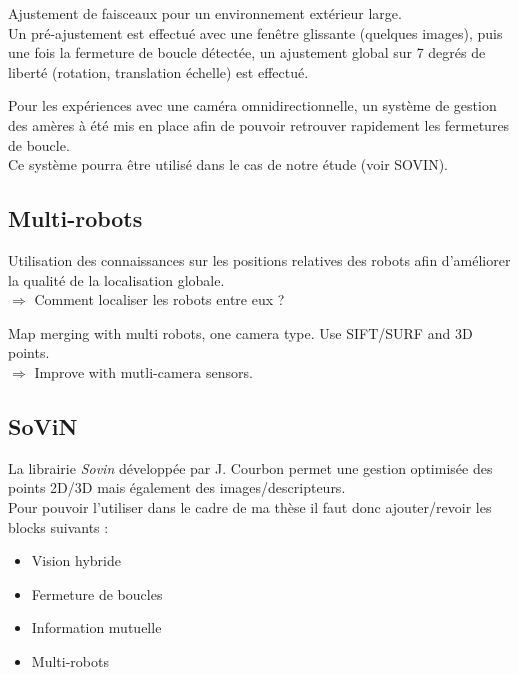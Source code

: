 Ajustement de faisceaux pour un environnement extérieur large.\\
Un pré-ajustement est effectué avec une fenêtre glissante (quelques images), puis une fois la fermeture de boucle détectée, un ajustement global sur 7 degrés de liberté (rotation, translation échelle) est effectué. 



Pour les expériences avec une caméra omnidirectionnelle, un système de gestion des amères à été mis en place afin de pouvoir retrouver rapidement les fermetures de boucle.\\
Ce système pourra être utilisé dans le cas de notre étude (voir SOVIN).



\subsection{Multi-robots}

Utilisation des connaissances sur les positions relatives des robots afin d'améliorer la qualité de la localisation globale.\\
$\Rightarrow$ Comment localiser les robots entre eux ?





Map merging with multi robots, one camera type. Use SIFT/SURF and 3D points.\\
$\Rightarrow$ Improve with mutli-camera sensors. 



\subsection{SoViN}


La librairie \emph{Sovin} développée par J. Courbon permet une gestion optimisée des points 2D/3D mais également des images/descripteurs.\\
Pour pouvoir l'utiliser dans le cadre de ma thèse il faut donc ajouter/revoir les blocks suivants :
\begin{itemize}
\item Vision hybride
\item Fermeture de boucles
\item Information mutuelle
\item Multi-robots
\end{itemize}
